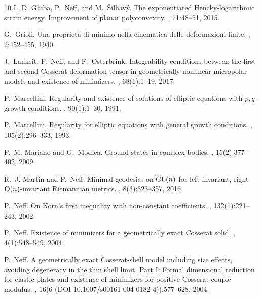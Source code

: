 \documentclass[11pt]{article}
\begin{document}
\begin{footnotesize}
\begin{thebibliography}{10}
I.~D. Ghiba, P.~Neff, and M.~{\v{S}}ilhav{\'y}.
\newblock The exponentiated {Hencky}-logarithmic strain energy. {Improvement}
  of planar polyconvexity.
, 71:48--51, 2015.

G.~Grioli.
\newblock Una propriet\`a di minimo nella cinematica delle deformazioni finite.
, 2:452--455, 1940.

J.~Lankeit, P.~Neff, and F.~Osterbrink.
\newblock Integrability conditions between the first and second {Cosserat}
  deformation tensor in geometrically nonlinear micropolar models and existence
  of minimizers.
,
  68(1):1--19, 2017.

P.~Marcellini.
\newblock Regularity and existence of solutions of elliptic equations with
  {$p,q$}-growth conditions.
, 90(1):1--30, 1991.

P.~Marcellini.
\newblock Regularity for elliptic equations with general growth conditions.
, 105(2):296--333, 1993.

P.~M. Mariano and G.~Modica.
\newblock Ground states in complex bodies.
, 15(2):377--402, 2009.

R.~J. Martin and P.~Neff.
\newblock Minimal geodesics on {${\rm GL}(n)$} for left-invariant, right-{${\rm
  O}(n)$}-invariant {Riemannian} metrics.
, 8(3):323--357, 2016.

P.~Neff.
\newblock On {Korn's} first inequality with non-constant coefficients.
, 132(1):221--243, 2002.

P.~Neff.
\newblock Existence of minimizers for a geometrically exact {Cosserat} solid.
,
  4(1):548--549, 2004.

P.~Neff.
\newblock A geometrically exact {C}osserat-shell model including size effects,
  avoiding degeneracy in the thin shell limit. {P}art {I}: {F}ormal dimensional
  reduction for elastic plates and existence of minimizers for positive
  {C}osserat couple modulus.
, 16(6 (DOI
  10.1007/s00161-004-0182-4)):577--628, 2004.


\end{thebibliography}
\end{footnotesize}
\end{document}
